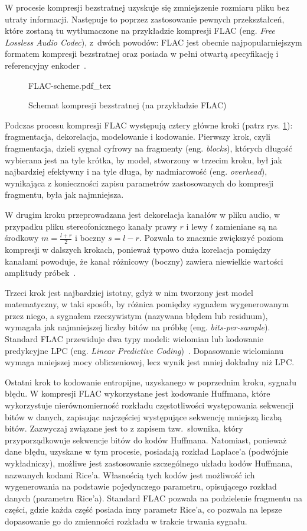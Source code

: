 \documentclass[pl,12pt]{aghdpl}
\begin{document}
W procesie kompresji bezstratnej uzyskuje się zmniejszenie rozmiaru pliku bez
utraty informacji. Następuje to poprzez zastosowanie pewnych przekształceń,
które zostaną tu wytłumaczone na przykładzie kompresji FLAC
(eng. \textit{Free Lossless Audio Codec}), z~dwóch powodów: FLAC jest obecnie
najpopularniejszym formatem kompresji bezstratnej oraz posiada w pełni otwartą
specyfikację i referencyjny enkoder~\cite{XiphFLAC}.

\begin{figure}[!tbh]
  \centering
  {FLAC-scheme.pdf_tex}
  \caption{Schemat kompresji bezstratnej (na przykładzie FLAC)}
  \label{fig:FLAC_scheme}
\end{figure}

Podczas procesu kompresji FLAC występują cztery główne kroki (patrz rys.
\ref{fig:FLAC_scheme}): fragmentacja, dekorelacja, modelowanie i kodowanie.
Pierwszy krok, czyli fragmentacja, dzieli sygnał cyfrowy na fragmenty (eng.
\textit{blocks}), których długość wybierana jest na tyle krótka, by model,
stworzony w trzecim kroku, był jak najbardziej efektywny i na tyle długa, by
nadmiarowość (eng. \textit{overhead}), wynikająca z konieczności zapisu
parametrów zastosowanych do kompresji fragmentu, była jak najmniejsza. 

W drugim kroku przeprowadzana jest dekorelacja kanałów w pliku audio, w
przypadku pliku stereofonicznego kanały prawy $r$ i lewy $l$ zamieniane są na środkowy
$m = \frac{l + r}{2}$ i boczny $s = l - r$. Pozwala to znacznie zwiększyć
poziom kompresji w dalszych krokach, ponieważ typowo duża korelacja pomiędzy
kanałami powoduje, że kanał różnicowy (boczny) zawiera niewielkie wartości
amplitudy próbek~\cite{MuinGunawanKartiwiElsheikh2017}.

Trzeci krok jest najbardziej istotny, gdyż w nim tworzony jest model
matematyczny, w taki sposób, by różnica pomiędzy sygnałem wygenerowanym przez
niego, a sygnałem rzeczywistym (nazywana błędem lub residuum), wymagała
jak najmniejszej liczby bitów na próbkę (eng. \textit{bits-per-sample}).
Standard FLAC przewiduje dwa typy modeli: wielomian lub kodowanie predykcyjne
LPC (eng. \textit{Linear Predictive Coding})~\cite{Shaughnessy1988}.
Dopasowanie wielomianu wymaga mniejszej mocy obliczeniowej, lecz wynik jest
mniej dokładny niż LPC.

Ostatni krok to kodowanie entropijne, uzyskanego w poprzednim kroku, sygnału
błędu. W kompresji FLAC wykorzystane jest kodowanie Huffmana, które
wykorzystuje nierównomierność rozkładu częstotliwości występowania sekwencji
bitów w danych, zapisując najczęściej występujące sekwencję mniejszą liczbą
bitów. Zazwyczaj związane jest to z zapisem tzw.\ słownika, który
przyporządkowuje sekwencje bitów do kodów Huffmana. Natomiast, ponieważ dane
błędu, uzyskane w tym procesie, posiadają rozkład Laplace'a (podwójnie
wykładniczy), możliwe jest zastosowanie szczególnego układu kodów Huffmana,
nazwanych kodami Rice'a. Własnością tych kodów jest możliwość ich wygenerowania
na podstawie pojedynczego parametru, opisującego rozkład danych (parametru
Rice'a). Standard FLAC pozwala na podzielenie fragmentu na części,
gdzie każda część posiada inny parametr Rice'a, co pozwala na lepsze
dopasowanie go do zmienności rozkładu w trakcie trwania sygnału.
\end{document}
